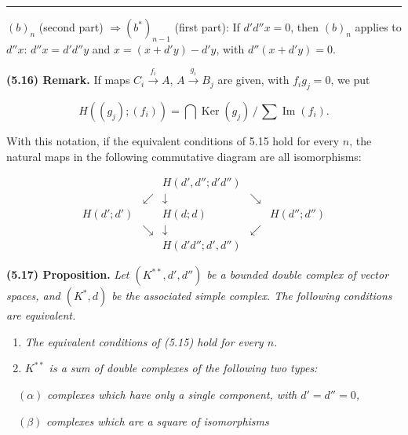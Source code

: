 \documentclass[
  english,
  a3paper,
  a3paper]{extarticle}
\begin{document}
\clearpage



\par

\vspace{0.7mm}\hrule\vspace{1.6mm}

\fontsize{9}{11}\selectfont

\((b)_n\) (second part) \(\Rightarrow(b^*)_{n-1}\) (first part): If
\(d'd''x=0\), then \((b)_n\) applies to \(d''x\): \(d''x=d'd''y\) and
\(x=(x+d'y)-d'y\), with \(d''(x+d'y)=0\).

\textbf{(5.16) Remark.} If maps \(C_i\xrightarrow{f_i}A\),
\(A\xrightarrow{g_i}B_j\) are given, with \(f_ig_j=0\), we put

\[H((g_j);(f_i))=\bigcap\operatorname{Ker}(g_j)\,/\,\sum\operatorname{Im}(f_i).\]

With this notation, if the equivalent conditions of 5.15 hold for every
\(n\), the natural maps in the following commutative diagram are all
isomorphisms:

\[\begin{array}{ccccc}&&H(d',d'';d'd'')&&\\&\swarrow&\downarrow&\searrow&\\H(d';d')&&H(d;d)&&H(d'';d'')\\&\searrow&\downarrow&\swarrow&\\&&H(d'd'';d',d'')&&\end{array}\]

\textbf{(5.17) Proposition.} \emph{Let \((K^{**},d',d'')\) be a bounded
double complex of vector spaces, and \((K^*,d)\) be the associated
simple complex. The following conditions are equivalent.}

\begin{enumerate}
\def\labelenumi{(\roman{enumi})}
\item
  \emph{The equivalent conditions of (5.15) hold for every \(n\).}
\item
  \emph{\(K^{**}\) is a sum of double complexes of the following two
  types:}
\end{enumerate}

\(\quad(\alpha)\) \emph{complexes which have only a single component,
with \(d'=d''=0\),}

\(\quad(\beta)\) \emph{complexes which are a square of isomorphisms}
\end{document}
